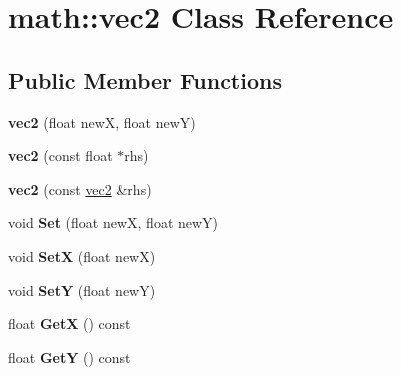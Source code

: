 \hypertarget{classmath_1_1vec2}{
\section{math::vec2 Class Reference}
\label{classmath_1_1vec2}
}
\subsection*{Public Member Functions}
\begin{DoxyCompactItemize}
\item 
\hypertarget{classmath_1_1vec2_a63bc6b918d8d28624a4d95402b9fd907}{
{\bfseries vec2} (float newX, float newY)}
\label{classmath_1_1vec2_a63bc6b918d8d28624a4d95402b9fd907}

\item 
\hypertarget{classmath_1_1vec2_abf6bb6a2fe2a07e3e94a4bdf391e0511}{
{\bfseries vec2} (const float $\ast$rhs)}
\label{classmath_1_1vec2_abf6bb6a2fe2a07e3e94a4bdf391e0511}

\item 
\hypertarget{classmath_1_1vec2_ad27de164751782279505517ac437e7ca}{
{\bfseries vec2} (const \hyperlink{classmath_1_1vec2}{vec2} \&rhs)}
\label{classmath_1_1vec2_ad27de164751782279505517ac437e7ca}

\item 
\hypertarget{classmath_1_1vec2_a79b19ec1502461f5b10eb32837c84b7e}{
void {\bfseries Set} (float newX, float newY)}
\label{classmath_1_1vec2_a79b19ec1502461f5b10eb32837c84b7e}

\item 
\hypertarget{classmath_1_1vec2_aaf83a59b7908360f6acde397e2e4aa71}{
void {\bfseries SetX} (float newX)}
\label{classmath_1_1vec2_aaf83a59b7908360f6acde397e2e4aa71}

\item 
\hypertarget{classmath_1_1vec2_a46eef0adb9afef2338b700a76a34de15}{
void {\bfseries SetY} (float newY)}
\label{classmath_1_1vec2_a46eef0adb9afef2338b700a76a34de15}

\item 
\hypertarget{classmath_1_1vec2_aa246d571ed230031358319b1065dd837}{
float {\bfseries GetX} () const }
\label{classmath_1_1vec2_aa246d571ed230031358319b1065dd837}

\item 
\hypertarget{classmath_1_1vec2_ab0110b4b4e82c789c1e6b6275944348a}{
float {\bfseries GetY} () const }
\label{classmath_1_1vec2_ab0110b4b4e82c789c1e6b6275944348a}


\end{DoxyCompactItemize}
